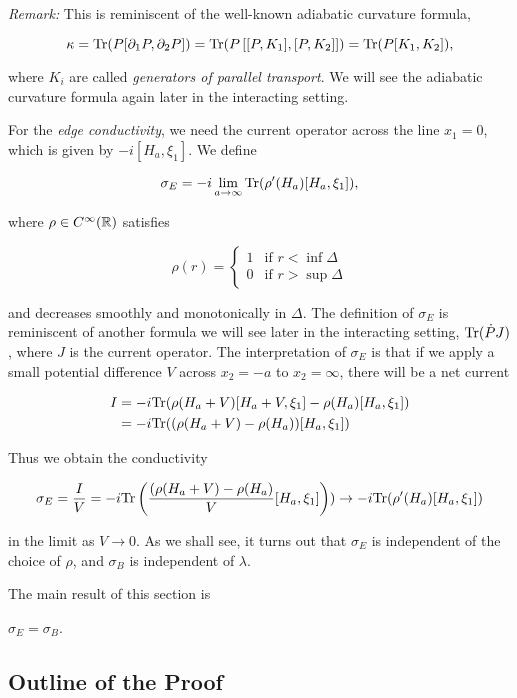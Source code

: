 \documentclass[12pt, letterpaper]{article}
\begin{document}
\textit{Remark:} This is reminiscent of the well-known adiabatic curvature formula,

\[\kappa = \text{Tr}(P[\partial_1P,\partial_2 P]) = \text{Tr}(P\left[ [P,K_1], [P,K_2] \right]) = \text{Tr}(P[K_1,K_2]),\]

where $K_i$ are called \textit{generators of parallel transport}. We will see the adiabatic curvature formula again later in the interacting setting. 

For the \textit{edge conductivity}, we need the current operator across the line $x_1=0$, which is given by $-i[H_a,\xi_1]$. We define 

\[\sigma_E = -i\lim_{a\to\infty}\text{Tr}(\rho'(H_a)[H_a,\xi_1]),\]

where $\rho \in C^\infty(\mathbb{R})$ satisfies

\[\rho(r) = \begin{cases} 1 & \text{if } r<\inf\Delta\\ 0 & \text{if } r>\sup\Delta\end{cases}\]

and decreases smoothly and monotonically in $\Delta$. The definition of $\sigma_E$ is reminiscent of another formula we will see later in the interacting setting, $\text{Tr}(\dot{P}J)$, where $J$ is the current operator. The interpretation of $\sigma_E$ is that if we apply a small potential difference $V$ across $x_2=-a$ to $x_2=\infty$, there will be a net current

\[\begin{aligned}
I &= -i\text{Tr}(\rho(H_a+V)[H_a+V,\xi_1] - \rho(H_a)[H_a,\xi_1])\\
&= -i\text{Tr}((\rho(H_a+V)-\rho(H_a))[H_a,\xi_1])
\end{aligned}\]

Thus we obtain the conductivity

\[\sigma_E = \frac{I}{V} = -i\text{Tr}\left(\frac{(\rho(H_a+V)-\rho(H_a)}{V}[H_a,\xi_1]\right)) \to -i\text{Tr}(\rho'(H_a)[H_a,\xi_1])\]

in the limit as $V\to0$. As we shall see, it turns out that $\sigma_E$ is independent of the choice of $\rho$, and $\sigma_B$ is independent of $\lambda$. 

The main result of this section is

\begin{theorem}
$\sigma_E=\sigma_B$.
\end{theorem}

\subsection{Outline of the Proof}
\end{document}
